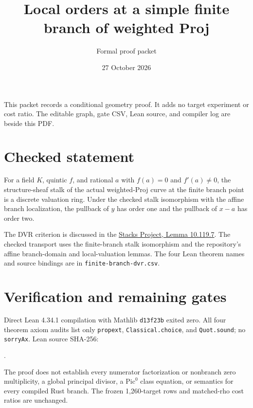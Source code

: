 \documentclass[11pt]{article}
\title{Local orders at a simple finite branch of weighted Proj}
\author{Formal proof packet}
\date{27 October 2026}
\begin{document}
\maketitle
\noindent This packet records a conditional geometry proof. It adds no target experiment or cost ratio. The editable graph, gate CSV, Lean source, and compiler log are beside this PDF.

\section*{Checked statement}
For a field $K$, quintic $f$, and rational $a$ with $f(a)=0$ and $f'(a)\ne0$, the structure-sheaf stalk of the actual weighted-Proj curve at the finite branch point is a discrete valuation ring. Under the checked stalk isomorphism with the affine branch localization, the pullback of $y$ has order one and the pullback of $x-a$ has order two.

\begin{center}
\setlength{\fboxsep}{9pt}
\end{center}

The DVR criterion is discussed in the \href{https://stacks.math.columbia.edu/tag/00PD}{Stacks Project, Lemma 10.119.7}. The checked transport uses the finite-branch stalk isomorphism and the repository's affine branch-domain and local-valuation lemmas. The four Lean theorem names and source bindings are in \texttt{finite-branch-dvr.csv}.

\section*{Verification and remaining gates}
Direct Lean 4.34.1 compilation with Mathlib \texttt{d13f23b} exited zero. All four theorem axiom audits list only \texttt{propext}, \texttt{Classical.choice}, and \texttt{Quot.sound}; no \texttt{sorryAx}. Lean source SHA-256:\par\smallskip{}.

The proof does not establish every numerator factorization or nonbranch zero multiplicity, a global principal divisor, a $\mathrm{Pic}^0$ class equation, or semantics for every compiled Rust branch. The frozen 1,260-target rows and matched-rho cost ratios are unchanged.
\end{document}
